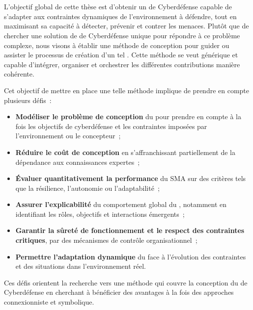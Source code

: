 \

\bigskip

\\

\noindent
L'objectif global de cette thèse est d'obtenir un  de Cyberdéfense capable de s'adapter aux contraintes dynamiques de l'environnement à défendre, tout en maximisant sa capacité à détecter, prévenir et contrer les menaces.
%
Plutôt que de chercher une solution de  de Cyberdéfense unique pour répondre à ce problème complexe, nous visons à établir une méthode de conception pour guider ou assister le processus de création d'un tel . Cette méthode se veut générique et capable d'intégrer, organiser et orchestrer les différentes contributions manière cohérente.

\noindent
Cet objectif de mettre en place une telle méthode implique de prendre en compte plusieurs défis~:
\begin{itemize}
    \item \textbf{Modéliser le problème de conception} du  pour prendre en compte à la fois les objectifs de cyberdéfense et les contraintes imposées par l'environnement ou le concepteur~;
    \item \textbf{Réduire le coût de conception} en s'affranchissant partiellement de la dépendance aux connaissances expertes~;
    \item \textbf{Évaluer quantitativement la performance} du SMA sur des critères tels que la résilience, l'autonomie ou l'adaptabilité~;
    \item \textbf{Assurer l'explicabilité} du comportement global du , notamment en identifiant les rôles, objectifs et interactions émergents~;
    \item \textbf{Garantir la sûreté de fonctionnement et le respect des contraintes critiques}, par des mécanismes de contrôle organisationnel~;
    \item \textbf{Permettre l'adaptation dynamique} du  face à l'évolution des contraintes et des situations dans l'environnement réel.
\end{itemize}

\noindent
Ces défis orientent la recherche vers une méthode qui couvre la conception du  de Cyberdéfense en cherchant à bénéficier des avantages à la fois des approches connexionniste et symbolique.

\

\bigskip

